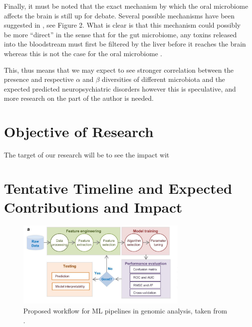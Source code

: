 \documentclass{article}
\begin{document}
\begin{multicols}{2}
 Finally, it must be noted that the exact mechanism by which the oral microbiome affects the brain is still up for debate. Several possible mechanisms have been suggested in \cite{tao_relationship_2024}, see Figure 2. What is clear is that this mechanism could possibly be more ``direct'' in the sense that for the gut microbiome, any toxins released into the bloodstream must first be filtered by the liver before it reaches the brain whereas this is not the case for the oral microbiome \cite{tao_relationship_2024}. 
 
 This, thus means that we may expect to see stronger correlation between the presence and respective $\alpha$ and $\beta$ diversities of different microbiota and the expected predicted neuropsychiatric disorders however this is speculative, and more research on the part of the author is needed.
\section{Objective of Research}
The target of our research will be to see the impact wit
\section{Tentative Timeline and Expected Contributions and Impact}

\begin{figure}[t]
\begin{center}
\includegraphics[width = 0.75\textwidth]{../figures/ml-workflow}
\caption{Proposed workflow for ML pipelines in genomic analysis, taken from \cite{li_machine_2022}.}
\end{center}
\end{figure}\label{mouth}


\end{multicols}
\end{document}
